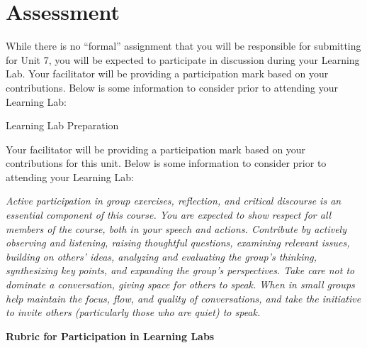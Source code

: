 \documentclass[
]{book}
\begin{document}
\hypertarget{assessment-6}{%
\section*{Assessment}\label{assessment-6}}

\begin{assessment}
While there is no ``formal'' assignment that you will be responsible for submitting for Unit 7, you will be expected to participate in discussion during your Learning Lab. Your facilitator will be providing a participation mark based on your contributions. Below is some information to consider prior to attending your Learning Lab:

{Learning Lab Preparation}

Your facilitator will be providing a participation mark based on your contributions for this unit. Below is some information to consider prior to attending your Learning Lab:

\emph{Active participation in group exercises, reflection, and critical discourse is an essential component of this course. You are expected to show respect for all members of the course, both in your speech and actions. Contribute by actively observing and listening, raising thoughtful questions, examining relevant issues, building on others' ideas, analyzing and evaluating the group's thinking, synthesizing key points, and expanding the group's perspectives. Take care not to dominate a conversation, giving space for others to speak. When in small groups help maintain the focus, flow, and quality of conversations, and take the initiative to invite others (particularly those who are quiet) to speak.}

\textbf{Rubric for Participation in Learning Labs}


\end{assessment}
\end{document}
